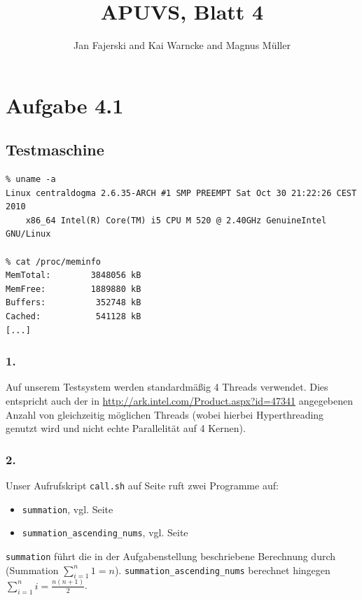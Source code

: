 \documentclass[a4paper,
12pt,
BCOR12mm,
]{scrartcl}
\title{APUVS, Blatt 4}
\author{Jan Fajerski and Kai Warncke and Magnus Müller}
\begin{document}

\maketitle 

\section*{Aufgabe 4.1}
\subsection{Testmaschine}
\begin{verbatim}
% uname -a
Linux centraldogma 2.6.35-ARCH #1 SMP PREEMPT Sat Oct 30 21:22:26 CEST 2010
	x86_64 Intel(R) Core(TM) i5 CPU M 520 @ 2.40GHz GenuineIntel GNU/Linux

% cat /proc/meminfo
MemTotal:        3848056 kB
MemFree:         1889880 kB
Buffers:          352748 kB
Cached:           541128 kB
[...]
\end{verbatim}

\subsubsection*{1.}
Auf unserem Testsystem werden standardmäßig 4 Threads verwendet. Dies entspricht auch der
in \url{http://ark.intel.com/Product.aspx?id=47341} angegebenen Anzahl von gleichzeitig
möglichen Threads (wobei hierbei Hyperthreading genutzt wird und nicht echte
Parallelität auf 4 Kernen).

\subsubsection*{2.}
Unser Aufrufskript \verb|call.sh| auf Seite \pageref{src:call} ruft zwei Programme auf:
\begin{itemize}
	\item \verb|summation|, vgl. Seite \pageref{src:sum}
	\item \verb|summation_ascending_nums|, vgl. Seite \pageref{src:ascend}
\end{itemize}

\verb|summation| führt die in der Aufgabenstellung beschriebene Berechnung durch
(Summation $\sum_{i=1}^{n} 1 = n$). \verb|summation_ascending_nums| berechnet hingegen
$\sum_{i=1}^{n} i = \frac{n (n+1)}{2}$. \\
\end{document}
